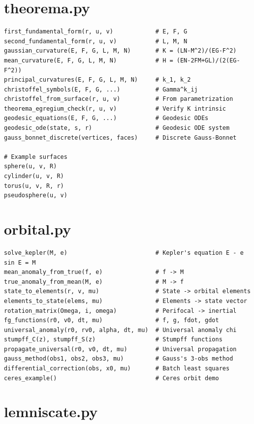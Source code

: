 \section{theorema.py}

\begin{lstlisting}[style=python]
first_fundamental_form(r, u, v)            # E, F, G
second_fundamental_form(r, u, v)           # L, M, N
gaussian_curvature(E, F, G, L, M, N)       # K = (LN-M^2)/(EG-F^2)
mean_curvature(E, F, G, L, M, N)           # H = (EN-2FM+GL)/(2(EG-F^2))
principal_curvatures(E, F, G, L, M, N)     # k_1, k_2
christoffel_symbols(E, F, G, ...)          # Gamma^k_ij
christoffel_from_surface(r, u, v)          # From parametrization
theorema_egregium_check(r, u, v)           # Verify K intrinsic
geodesic_equations(E, F, G, ...)           # Geodesic ODEs
geodesic_ode(state, s, r)                  # Geodesic ODE system
gauss_bonnet_discrete(vertices, faces)     # Discrete Gauss-Bonnet

# Example surfaces
sphere(u, v, R)
cylinder(u, v, R)
torus(u, v, R, r)
pseudosphere(u, v)
\end{lstlisting}

\section{orbital.py}

\begin{lstlisting}[style=python]
solve_kepler(M, e)                         # Kepler's equation E - e sin E = M
mean_anomaly_from_true(f, e)               # f -> M
true_anomaly_from_mean(M, e)               # M -> f
state_to_elements(r, v, mu)                # State -> orbital elements
elements_to_state(elems, mu)               # Elements -> state vector
rotation_matrix(Omega, i, omega)           # Perifocal -> inertial
fg_functions(r0, v0, dt, mu)               # f, g, fdot, gdot
universal_anomaly(r0, rv0, alpha, dt, mu)  # Universal anomaly chi
stumpff_C(z), stumpff_S(z)                 # Stumpff functions
propagate_universal(r0, v0, dt, mu)        # Universal propagation
gauss_method(obs1, obs2, obs3, mu)         # Gauss's 3-obs method
differential_correction(obs, x0, mu)       # Batch least squares
ceres_example()                            # Ceres orbit demo
\end{lstlisting}

\section{lemniscate.py}

